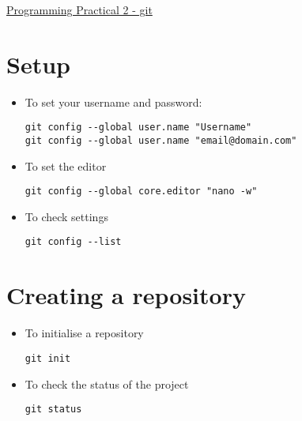 \documentclass{article}[18pt]
\begin{document}
\begin{center}
\underline{\huge Programming Practical 2 - git}
\end{center}
\section{Setup}
\begin{itemize}
\item To set your username and password:
\begin{lstlisting}[mathescape=true]
git config --global user.name "Username"
git config --global user.name "email@domain.com"
\end{lstlisting}
\item To set the editor
\begin{lstlisting}[mathescape=true]
git config --global core.editor "nano -w"
\end{lstlisting}
\item To check settings
\begin{lstlisting}[mathescape=true]
git config --list
\end{lstlisting}
\end{itemize}
\section{Creating a repository}
\begin{itemize}
\item To initialise a repository
\begin{lstlisting}[mathescape=true]
git init
\end{lstlisting}
\item To check the status of the project
\begin{lstlisting}[mathescape=true]
git status
\end{lstlisting}
\end{itemize}
\end{document}
